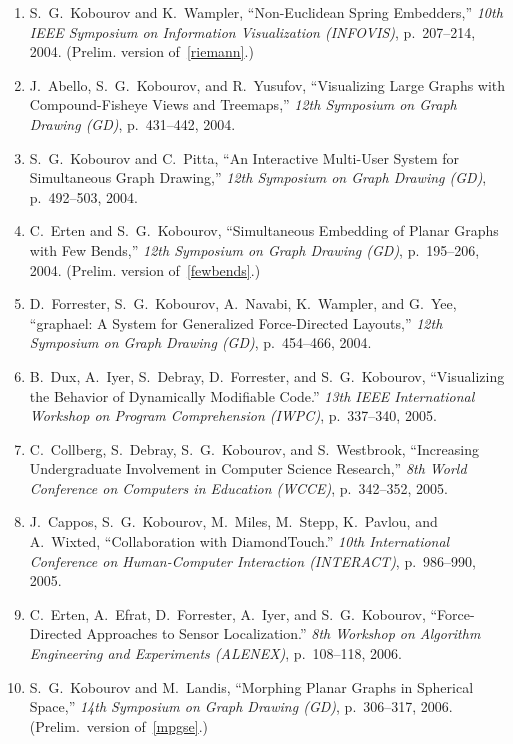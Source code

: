 \documentclass[10pt]{article}
\begin{document}
\begin{description}
\begin{enumerate}
\item S.~G.~Kobourov and K.~Wampler, ``Non-Euclidean Spring Embedders,'' {\em 10th IEEE Symposium on Information Visualization (INFOVIS)}, p.~207--214, 2004. (Prelim. version of~\ref{riemann}.)

\item J.~Abello, S.~G.~Kobourov, and R.~Yusufov, ``Visualizing Large Graphs with Compound-Fisheye Views and Treemaps,'' {\em 12th
Symposium on Graph Drawing (GD)},  p.~431--442, 2004.

\item S.~G.~Kobourov and C.~Pitta, ``An Interactive Multi-User System for Simultaneous Graph Drawing,'' {\em 12th
Symposium on Graph Drawing (GD)},  p.~492--503, 2004.

\item C.~Erten and S.~G.~Kobourov, ``Simultaneous Embedding of Planar Graphs with Few Bends,'' {\em 12th
Symposium on Graph Drawing (GD)},  p.~195--206, 2004.
(Prelim. version of~\ref{fewbends}.)

\item D.~Forrester, S.~G.~Kobourov, A.~Navabi, K.~Wampler, and G.~Yee, ``graphael: A System for Generalized Force-Directed Layouts,'' {\em 12th
Symposium on Graph Drawing (GD)},  p.~454--466, 2004.

\item B.~Dux, A.~Iyer, S.~Debray, D.~Forrester, and S.~G.~Kobourov, ``Visualizing the Behavior of Dynamically Modifiable Code.'' {\em 13th IEEE International Workshop on Program Comprehension (IWPC)}, p.~337--340, 2005. 

\item C.~Collberg, S.~Debray, S.~G.~Kobourov, and S.~Westbrook, ``Increasing Undergraduate Involvement in Computer Science Research,'' {\em  8th World Conference on Computers in Education (WCCE)}, p.~342--352, 2005.

\item J.~Cappos, S.~G.~Kobourov, M.~Miles, M.~Stepp, K.~Pavlou, and A.~Wixted, ``Collaboration with DiamondTouch.'' {\em 10th International Conference on
Human-Computer Interaction (INTERACT)}, p.~986--990, 2005.


\item C.~Erten, A.~Efrat, D.~Forrester, A.~Iyer, and S.~G.~Kobourov, ``Force-Directed Approaches to Sensor Localization.'' {\em 8th Workshop on Algorithm Engineering and Experiments (ALENEX)}, p.~108--118, 2006.


\item S.~G.~Kobourov and M.~Landis, 
``Morphing Planar Graphs in Spherical Space,'' {\em 14th Symposium on Graph Drawing (GD)}, p.~306--317, 2006. (Prelim.~version of~\ref{mpgse}.)



\end{enumerate}
\end{description}
\end{document}
